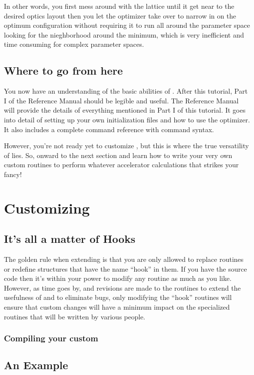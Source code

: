 \documentclass{report}
\begin{document}
In other words, you first mess around with the lattice until it get near to the
desired optics layout then you let the optimizer take over to narrow in on the
optimum configuration without requiring it to run all around the
parameter space looking for the nieghborhood around the minimum, which is very
inefficient and time consuming for complex parameter spaces.


\chapter{Where to go from here}
\label{c:where_to_go}

You now have an understanding of the basic abilities of \tao. After this
tutorial, Part I of the \tao Reference Manual should be legible and useful.
The Reference Manual will provide the details of everything mentioned in Part I
of this tutorial. It goes into detail of setting up your own initialization
files and how to use the optimizer. It also includes a complete command
reference with command syntax.

However, you're not ready yet to customize \tao, but this is where the true versatility
of \tao lies. So, onward to the next section and learn how to write your very
own custom routines to perform whatever accelerator calculations that strikes your
fancy!

\part{Customizing \tao}
\label{p:custom_tao}

\chapter{It's all a matter of Hooks}

The golden rule when extending \tao is that you are only allowed to replace
routines or redefine structures that have the name ``hook'' in them. 
If you have the source code then it's within your power to modify any routine as much 
as you like. However, as time
goes by, and revisions are made to the \tao routines to extend the
usefulness of \tao and to eliminate bugs, only modifying the ``hook'' routines
will ensure that custom changes will
have a minimum impact on the specialized routines that will be written
by various people. 

\section{Compiling your custom \tao}


\chapter{An Example}

\end{document}
